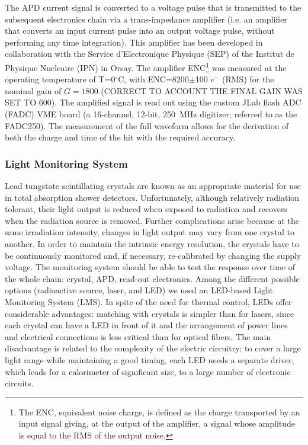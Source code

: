 The APD current signal is converted to a voltage pulse that is transmitted to the subsequent electronics chain via a
trans-impedance amplifier (i.e. an amplifier that converts an input current pulse into an output voltage pulse, without
performing any time integration). This amplifier has been developed in collaboration with the Service d’Electronique
Physique (SEP) of the Institut de Physique Nucleaire (IPN) in Orsay. The amplifier ENC\footnote{The ENC,
  equivalent noise charge, is defined as the charge transported by an input signal giving, at the output of the amplifier,
  a signal whose amplitude is equal to the RMS of the output noise.} was measured at the operating temperature of
T=0$^\circ$C,  with ENC=8200$\pm$100 $e^-$ (RMS) for the nominal gain of $G=1800$ {\color{red} (CORRECT
  TO ACCOUNT THE FINAL GAIN WAS SET TO 600)}. The amplified signal is read out using the custom JLab flash
ADC (FADC) VME board (a 16-channel, 12-bit, 250~MHz digitizer; referred to as the FADC250). The measurement
of the full waveform allows for the derivation of both the charge and time of the hit with the required  accuracy.

\subsubsection{Light Monitoring System}

Lead tungstate scintillating crystals are known as an appropriate material for use in total absorption shower
detectors. Unfortunately, although relatively radiation tolerant, their light output is reduced when exposed to 
radiation and recovers when the radiation source is removed. Further complications arise because at the same
irradiation intensity, changes in light output may vary from one crystal to another. In order to maintain the intrinsic
energy resolution, the crystals have to be continuously monitored and, if necessary, re-calibrated by changing the
supply voltage. The monitoring system should be able to test the response over time of the whole chain: crystal,
APD, read-out electronics. Among the different possible options (radioactive source, laser, and LED) we used an
LED-based Light Monitoring System (LMS). In spite of the need for thermal control, LEDs offer considerable
advantages: matching with crystals is simpler than for lasers, since each crystal can have a LED in front of it and
the arrangement of power lines and electrical connections is less critical than for optical fibers. The main
disadvantage is related to the complexity of the electric circuitry: to cover a large light range while maintaining a
good timing, each LED needs a separate driver, which leads for a calorimeter of significant size, to a large number
of electronic circuits.

